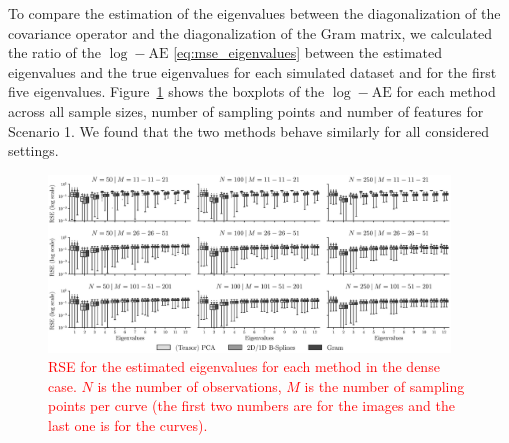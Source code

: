 \begin{results}
To compare the estimation of the eigenvalues between the diagonalization of the covariance operator and the diagonalization of the Gram matrix, we calculated the ratio of the $\log-\text{AE}$ \eqref{eq:mse_eigenvalues} between the estimated eigenvalues and the true eigenvalues for each simulated dataset and for the first five eigenvalues.
Figure~\ref{fig:logAE_mfd_1d} shows the boxplots of the $\log-\text{AE}$ for each method across all sample sizes, number of sampling points and number of features for Scenario 1. We found that the two methods behave similarly for all considered settings.

\begin{figure}
    \centering
    \includegraphics[width=0.95\textwidth]{figures/AE.eps}
    \caption{\textcolor{red}{RSE for the estimated eigenvalues for each method in the dense case. $N$ is the number of observations, $M$ is the number of sampling points per curve (the first two numbers are for the images and the last one is for the curves).}}
    \label{fig:logAE_mfd_1d}
\end{figure}
\end{results}

